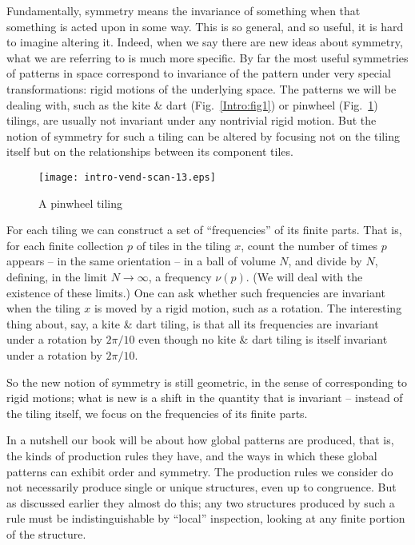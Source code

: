 \documentclass[reqno]{stml-l}
\theoremstyle{plain}
\theoremstyle{definition}
\numberwithin{equation}{chapter}
\begin{document}
Fundamentally, symmetry means the invariance of something when that something is acted upon in some way. This is so general, and so useful, it is hard to imagine altering it. Indeed, when we say there are new ideas about symmetry, what we are referring to is much more specific. By far the most useful symmetries of patterns in space correspond to invariance of the pattern under very special transformations: rigid motions of the underlying space. The patterns we will be dealing with, such as the kite \& dart (Fig.~\ref{Intro:fig1}) or pinwheel (Fig.~\ref{Intro:fig13}) tilings, are usually not invariant under any nontrivial rigid motion. But the notion of symmetry for such a tiling can be altered by focusing not on the tiling itself but on the relationships between its component tiles.

\begin{figure}[!h]
\texttt{[image: intro-vend-scan-13.eps]}
\caption{A pinwheel tiling}\label{Intro:fig13}
\end{figure}

For each tiling we can construct a set of ``frequencies'' of its finite parts. That is, for each finite collection $p$ of tiles in the tiling $x$, count the number of times $p$ appears -- in the same orientation -- in a ball of volume $N$, and divide by $N$, defining, in the limit $N\rightarrow\infty$, a frequency $\nu(p)$. (We will deal with the existence of these limits.) One can ask whether such frequencies are invariant when the tiling $x$ is moved by a rigid motion, such as a rotation. The interesting thing about, say, a kite \& dart tiling, is that all its frequencies are invariant under a rotation by $2\pi/10$ even though no kite \& dart tiling is itself invariant under a rotation by $2\pi/10$.

So the new notion of symmetry is still geometric, in the sense of corresponding to rigid motions; what is new is a shift in the quantity that is invariant -- instead of the tiling itself, we focus on the frequencies of its finite parts.

In a nutshell our book will be about how global patterns are produced, that is, the kinds of production rules they have, and the ways in which these global patterns can exhibit order and symmetry. The production rules we consider do not necessarily produce single or unique structures, even up to congruence. But as discussed earlier they almost do this; any two structures produced by such a rule must be indistinguishable by ``local'' inspection, looking at any finite portion of the structure.
\end{document}
